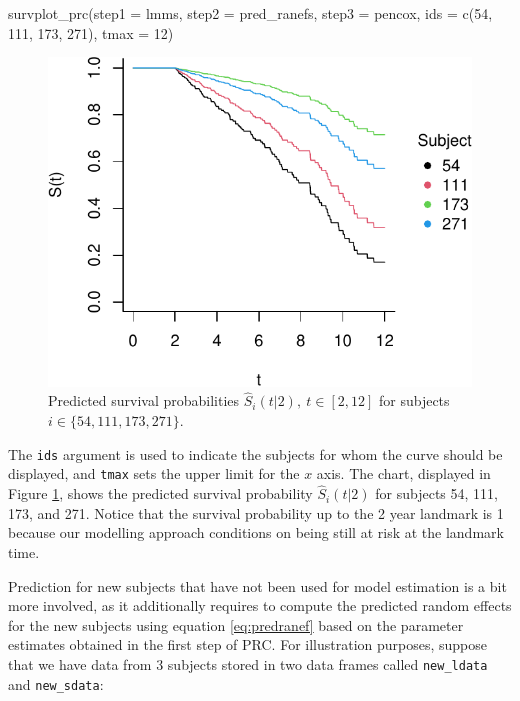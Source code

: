 \begin{Schunk}
\begin{Sinput}
survplot_prc(step1 = lmms, step2 = pred_ranefs, step3 = pencox, 
             ids = c(54, 111, 173, 271), tmax = 12)
\end{Sinput}
\begin{figure}
\includegraphics{pencal-RJ_files/figure-latex/survplot-1} \caption{Predicted survival probabilities $\hat{S}_i(t | 2), \:t \in [2, 12]$ for subjects $i \in \{54, 111, 173, 271\}$.}\label{fig:survplot}
\end{figure}
\end{Schunk}

The \texttt{ids} argument is used to indicate the subjects for whom the
curve should be displayed, and \texttt{tmax} sets the upper limit for
the \(x\) axis. The chart, displayed in Figure \ref{fig:survplot}, shows
the predicted survival probability \(\hat{S}_i(t | 2)\) for subjects 54,
111, 173, and 271. Notice that the survival probability up to the 2 year
landmark is 1 because our modelling approach conditions on being still
at risk at the landmark time.

Prediction for new subjects that have not been used for model estimation
is a bit more involved, as it additionally requires to compute the
predicted random effects for the new subjects using equation
\eqref{eq:predranef} based on the parameter estimates obtained in the
first step of PRC. For illustration purposes, suppose that we have data
from 3 subjects stored in two data frames called \texttt{new\_ldata} and
\texttt{new\_sdata}:

